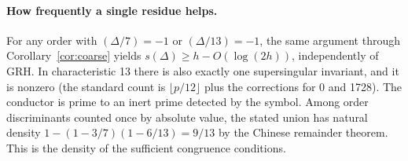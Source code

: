 \paragraph{How frequently a single residue helps.}
For any order with $(\Delta/7)=-1$ or $(\Delta/13)=-1$, the same argument through Corollary~\ref{cor:coarse} yields
$s(\Delta)\ge h-O(\log(2h))$, independently of GRH. In characteristic 13 there is also exactly one supersingular invariant, and it is nonzero (the standard count is $\lfloor p/12\rfloor$ plus the corrections for 0 and 1728). The conductor is prime to an inert prime detected by the symbol. Among order discriminants counted once by absolute value, the stated union has natural density $1-(1-3/7)(1-6/13)=9/13$ by the Chinese remainder theorem. This is the density of the sufficient congruence conditions.

